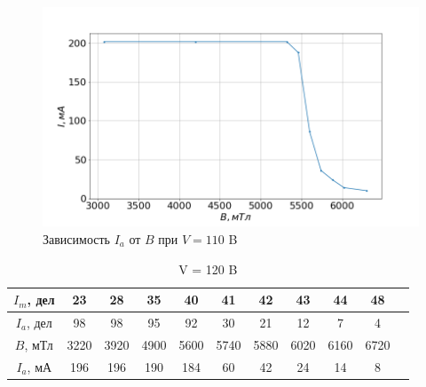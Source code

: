\documentclass[a4paper, fontsize=14pt]{article}
\begin{document}
\begin{figure}[H]
\center
\includegraphics[scale=0.4]{5.png}
\caption{Зависимость $I_a$ от $B$ при $V = 110$ B}
\end{figure}

\begin{table}[H]

	\centering
\begin{tabular}{|c|c|c|c|c|c|c|c|c|c|c|}
     \hline
     $I_m$, дел &	23&	28&	35&	40&	41&	42&	43&	44&	48
\\ \hline
     $I_a$, дел &	98&	98&	95&	92&	30&	21&	12&	7&	4
 \\ \hline
     $B$, мТл&	3220&	3920&	4900&	5600&	5740&	5880&	6020&	6160&	6720
\\ \hline
$I_a$, мА &	196&	196&	190	&184&	60&	42&	24&	14&	8
\\ \hline

\end{tabular}
	\caption{V = 120 B}
\end{table}
\end{document}
